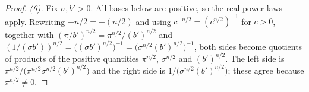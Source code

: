 \begin{proof}
\emph{(6).}  Fix $\sigma, b' > 0$.  All bases below are positive, so the real power
laws apply.  Rewriting $-n/2 = -(n/2)$ and using
$c^{-n/2} = (c^{n/2})^{-1}$ for $c > 0$, together with
$(\pi/b')^{n/2} = \pi^{n/2}/(b')^{n/2}$ and
$(1/(\sigma b'))^{n/2} = \bigl((\sigma b')^{n/2}\bigr)^{-1}
  = \bigl(\sigma^{n/2}(b')^{n/2}\bigr)^{-1}$, both sides become quotients of products
of the positive quantities $\pi^{n/2}$, $\sigma^{n/2}$ and $(b')^{n/2}$.  The left side
is $\pi^{n/2}/\bigl(\pi^{n/2}\sigma^{n/2}(b')^{n/2}\bigr)$ and the right side is
$1/\bigl(\sigma^{n/2}(b')^{n/2}\bigr)$; these agree because $\pi^{n/2} \neq 0$.
\end{proof}
